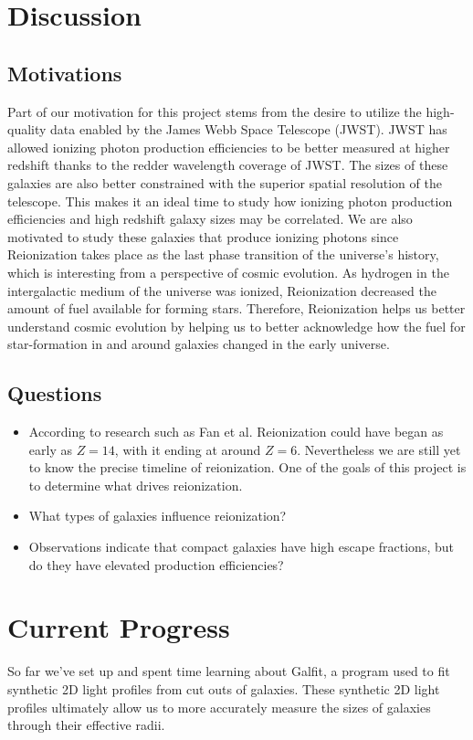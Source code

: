 \documentclass{article}
\begin{document}
\section{Discussion}

\subsection{Motivations}

Part of our motivation for this project stems from the desire to utilize the high-quality data enabled by the James Webb Space Telescope (JWST). JWST has allowed ionizing photon production efficiencies to be better measured at higher redshift thanks to the redder wavelength coverage of JWST. The sizes of these galaxies are also better constrained with the superior spatial resolution of the telescope. This makes it an ideal time to study how ionizing photon production efficiencies and high redshift galaxy sizes may be correlated. We are also motivated to study these galaxies that produce ionizing photons since Reionization takes place as the last phase transition of the universe's history, which is interesting from a perspective of cosmic evolution. As hydrogen in the intergalactic medium of the universe was ionized, Reionization decreased the amount of fuel available for forming stars. Therefore, Reionization helps us better understand cosmic evolution by helping us to better acknowledge how the fuel for star-formation in and around galaxies changed in the early universe.

\subsection{Questions}

\begin{itemize}
    \item 
    According to research such as Fan et al. \cite{2006ARA&A..44..415F} Reionization could have began as early as \(Z = 14\), with it ending at around \(Z = 6\). Nevertheless we are still yet to know the precise timeline of reionization. One of the goals of this project is to determine what drives reionization.
    \item What types of galaxies influence reionization?
    \item Observations indicate that compact galaxies have high escape fractions, but do they have elevated production efficiencies?
\end{itemize}

\section{Current Progress}
So far we've set up and spent time learning about Galfit, a program used to fit synthetic 2D light profiles from cut outs of galaxies. These synthetic 2D light profiles ultimately allow us to more accurately measure the sizes of galaxies through their effective radii.
\end{document}

